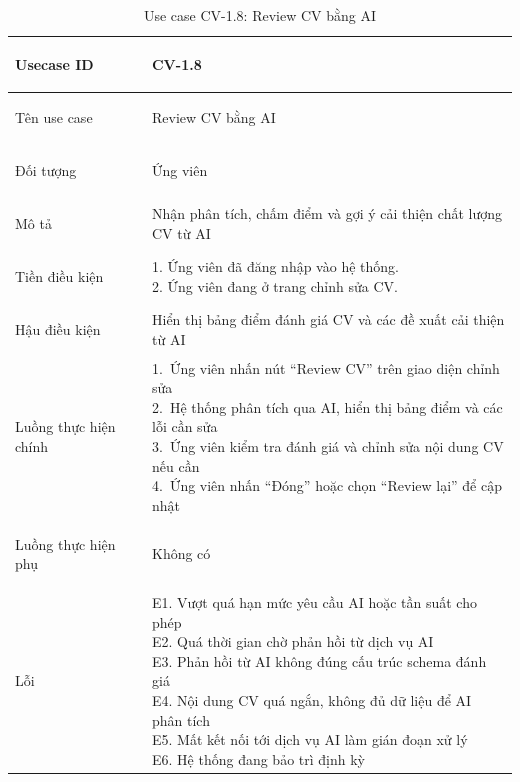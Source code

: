 \begin{table}[H]
    \centering
    \small
    \renewcommand{\arraystretch}{0.90}
    \begin{tabularx}{\textwidth}{|
        >{\bfseries\raggedright\arraybackslash}p{2.6cm}|Y|}
        \hline

        Usecase ID & CV-1.8 \\ \hline

        Tên use case & Review CV bằng AI \\ \hline

        Đối tượng & Ứng viên \\ \hline

        Mô tả & Nhận phân tích, chấm điểm và gợi ý cải thiện chất lượng CV từ AI \\ \hline

        Tiền điều kiện &
        \parbox[t]{\hsize}{
            1. Ứng viên đã đăng nhập vào hệ thống.\\
            2. Ứng viên đang ở trang chỉnh sửa CV.
        } \\
        \hline

        Hậu điều kiện & Hiển thị bảng điểm đánh giá CV và các đề xuất cải thiện từ AI \\ \hline

        Luồng thực hiện chính &
        \parbox[t]{\hsize}{
            1.\ Ứng viên nhấn nút ``Review CV'' trên giao diện chỉnh sửa\\
            2.\ Hệ thống phân tích qua AI, hiển thị bảng điểm và các lỗi cần sửa\\
            3.\ Ứng viên kiểm tra đánh giá và chỉnh sửa nội dung CV nếu cần\\
            4.\ Ứng viên nhấn ``Đóng'' hoặc chọn ``Review lại'' để cập nhật
        }\\
        \hline

        Luồng thực hiện phụ & Không có \\
        \hline

        Lỗi &
        \parbox[t]{\hsize}{
            E1. Vượt quá hạn mức yêu cầu AI hoặc tần suất cho phép\\
            E2. Quá thời gian chờ phản hồi từ dịch vụ AI\\
            E3. Phản hồi từ AI không đúng cấu trúc schema đánh giá\\
            E4. Nội dung CV quá ngắn, không đủ dữ liệu để AI phân tích\\
            E5. Mất kết nối tới dịch vụ AI làm gián đoạn xử lý\\
            E6. Hệ thống đang bảo trì định kỳ
        }\\
        \hline

    \end{tabularx}
    \caption{Use case CV-1.8: Review CV bằng AI}
    \label{tab:usecase-cv18}
\end{table}


